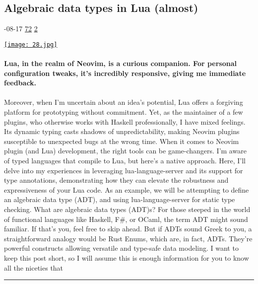 \documentclass[10pt,a4paper]{article}
\begin{document}
\begin{multicols}{2}
\begin{minipage}{\linewidth}
\subsection{Algebraic data types in Lua (almost)}
\textsc{\footnotesize
{\scriptsize\faCalendar}-08-17 
{\scriptsize\faThumbsOUp}\space 
\href{http://news.ycombinator.com/item?id=37163742\&utm\_term=comment}{72} 
{\scriptsize\faComments}\space 
\href{http://news.ycombinator.com/item?id=37163742\&utm\_term=comment}{2} 
}
\par\medskip\noindent
\href{https://mrcjkb.dev/posts/2023-08-17-lua-adts.html?utm\_source=hackernewsletter\&utm\_medium=email\&utm\_term=code}{
    \texttt{[image: 28.jpg]}
}
\end{minipage}
\paragraph{}
\textbf{Lua, in the realm of Neovim, is a curious companion. For personal configuration tweaks, it’s incredibly responsive, giving me immediate feedback.}
\paragraph{}
 Moreover, when I’m uncertain about an idea’s potential, Lua offers a forgiving platform for prototyping without commitment.
Yet, as the maintainer of a few plugins, who otherwise works with Haskell professionally, I have mixed feelings. Its dynamic typing casts shadows of unpredictability, making Neovim plugins susceptible to unexpected bugs at the wrong time.
When it comes to Neovim plugin (and Lua) development, the right tools can be game-changers.
I’m aware of typed languages that compile to Lua, but here’s a native approach.
Here, I’ll delve into my experiences in leveraging
lua-language-server
and its support for type annotations,
demonstrating how they can elevate the robustness and expressiveness of your Lua code.
As an example, we will be attempting to define an algebraic data type (ADT),
and using
lua-language-server for static type checking.
What are algebraic data types (ADT)s?
For those steeped in the world of functional languages like Haskell, F\#, or OCaml, the term ADT might sound familiar. If that’s you, feel free to skip ahead.
But if ADTs sound Greek to you, a straightforward analogy would be Rust Enums, which are, in fact, ADTs. They’re powerful constructs allowing versatile and type-safe data modeling.
I want to keep this post short, so I will assume this is enough information for you to know all the niceties that
\par\noindent\textcolor{red}{\rule{\linewidth}{0.2mm}}
\vfill
\null
\end{multicols}
\end{document}
